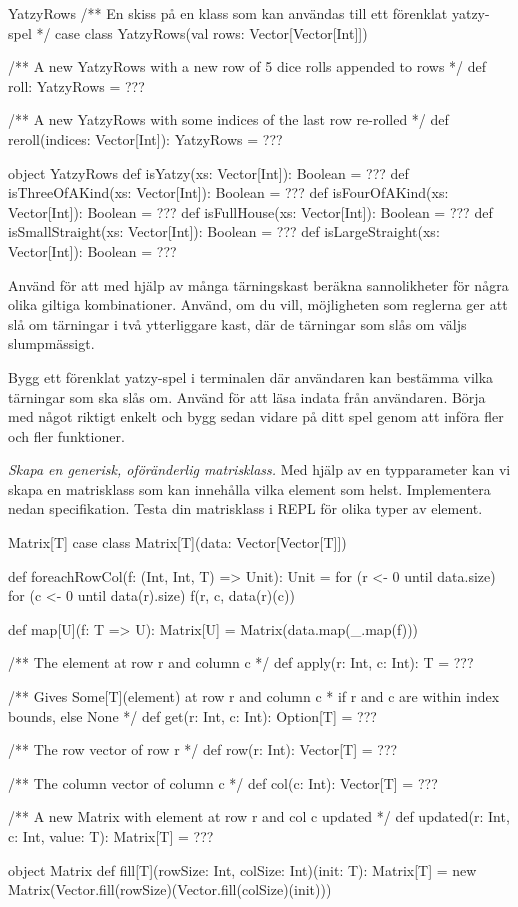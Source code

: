 \begin{ScalaSpec}{YatzyRows}
/** En skiss på en klass som kan användas till ett förenklat yatzy-spel */
case class YatzyRows(val rows: Vector[Vector[Int]]) {
  /** A new YatzyRows with a new row of 5 dice rolls appended to rows  */
  def roll: YatzyRows = ???

  /** A new YatzyRows with some indices of the last row re-rolled  */
  def reroll(indices: Vector[Int]): YatzyRows = ???
}

object YatzyRows {
  def isYatzy(xs: Vector[Int]): Boolean = ???
  def isThreeOfAKind(xs: Vector[Int]): Boolean = ???
  def isFourOfAKind(xs: Vector[Int]): Boolean = ???
  def isFullHouse(xs: Vector[Int]): Boolean = ???
  def isSmallStraight(xs: Vector[Int]): Boolean = ???
  def isLargeStraight(xs: Vector[Int]): Boolean = ???
}
\end{ScalaSpec}


\Subtask Använd  för att med hjälp av många tärningskast beräkna sannolikheter för några olika giltiga kombinationer. Använd, om du vill, möjligheten som reglerna ger att slå om tärningar i två ytterliggare kast, där de tärningar som slås om väljs slumpmässigt.

\Subtask Bygg ett förenklat yatzy-spel i terminalen där användaren kan bestämma vilka tärningar som ska slås om. Använd  för att läsa indata från användaren. Börja med något riktigt enkelt och bygg sedan vidare på ditt spel genom att införa fler och fler funktioner.


\clearpage


\AdvancedTasks %


\Task \label{task:generic-matrix} \emph{Skapa en generisk, oföränderlig matrisklass.} Med hjälp av en typparameter kan vi skapa en matrisklass som kan innehålla vilka element som helst. Implementera nedan specifikation. Testa din matrisklass i REPL för olika typer av element.

\begin{ScalaSpec}{Matrix[T]}
case class Matrix[T](data: Vector[Vector[T]]){

  def foreachRowCol(f: (Int, Int, T) => Unit): Unit =
    for (r <- 0 until data.size) {
      for (c <- 0 until data(r).size) {
        f(r, c, data(r)(c))
      }
    }

  def map[U](f: T => U): Matrix[U] = Matrix(data.map(_.map(f)))

  /** The element at row r and column c */
  def apply(r: Int, c: Int): T = ???

  /** Gives Some[T](element) at row r and column c
   *  if r and c are within index bounds, else None */
  def get(r: Int, c: Int): Option[T] = ???

  /** The row vector of row r */
  def row(r: Int): Vector[T] = ???

  /** The column vector of column c */
  def col(c: Int): Vector[T] = ???

  /** A new Matrix with element at row r and col c updated */
  def updated(r: Int, c: Int, value: T): Matrix[T] = ???
}
object Matrix {
  def fill[T](rowSize: Int, colSize: Int)(init: T): Matrix[T] =
    new Matrix(Vector.fill(rowSize)(Vector.fill(colSize)(init)))
}
\end{ScalaSpec}

